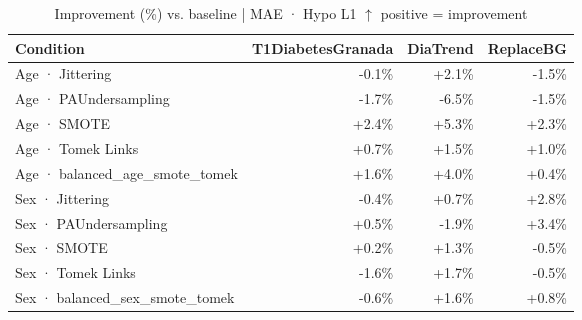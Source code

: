 \begin{table}[htbp]
\centering
\small
\caption{Improvement (\%) vs. baseline  |  MAE · Hypo L1  $\uparrow$ positive = improvement}
\label{tab:delta_mae_tbr_1_family_mechanism_guided}
\begin{tabular}{lrrr}
\toprule
\textbf{Condition} & \textbf{T1DiabetesGranada} & \textbf{DiaTrend} & \textbf{ReplaceBG} \\
\midrule
Age · Jittering & \textcolor{BrickRed}{-0.1\%} & \textcolor{OliveGreen}{+2.1\%} & \textcolor{BrickRed}{-1.5\%} \\
Age · PAUndersampling & \textcolor{BrickRed}{-1.7\%} & \textcolor{BrickRed}{-6.5\%} & \textcolor{BrickRed}{-1.5\%} \\
Age · SMOTE & \textcolor{OliveGreen}{+2.4\%} & \textcolor{OliveGreen}{+5.3\%} & \textcolor{OliveGreen}{+2.3\%} \\
Age · Tomek Links & \textcolor{OliveGreen}{+0.7\%} & \textcolor{OliveGreen}{+1.5\%} & \textcolor{OliveGreen}{+1.0\%} \\
Age · balanced_age_smote_tomek & \textcolor{OliveGreen}{+1.6\%} & \textcolor{OliveGreen}{+4.0\%} & \textcolor{OliveGreen}{+0.4\%} \\
\midrule
Sex · Jittering & \textcolor{BrickRed}{-0.4\%} & \textcolor{OliveGreen}{+0.7\%} & \textcolor{OliveGreen}{+2.8\%} \\
Sex · PAUndersampling & \textcolor{OliveGreen}{+0.5\%} & \textcolor{BrickRed}{-1.9\%} & \textcolor{OliveGreen}{+3.4\%} \\
Sex · SMOTE & \textcolor{OliveGreen}{+0.2\%} & \textcolor{OliveGreen}{+1.3\%} & \textcolor{BrickRed}{-0.5\%} \\
Sex · Tomek Links & \textcolor{BrickRed}{-1.6\%} & \textcolor{OliveGreen}{+1.7\%} & \textcolor{BrickRed}{-0.5\%} \\
Sex · balanced_sex_smote_tomek & \textcolor{BrickRed}{-0.6\%} & \textcolor{OliveGreen}{+1.6\%} & \textcolor{OliveGreen}{+0.8\%} \\
\bottomrule
\end{tabular}
\end{table}